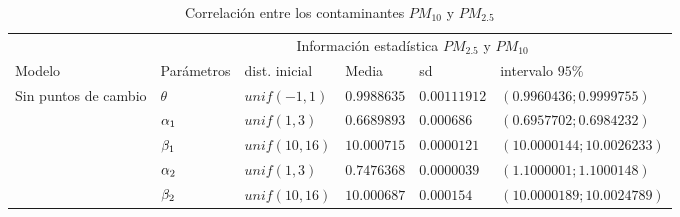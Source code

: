 \begin{table}[!h]
\centering
\begin{tabular}{|l|l|l|l|l|l|}
\hline
& \multicolumn{5}{c|}{Información estadística $PM_{2.5}$ y $PM_{10}$ } \\
\cline{2-6}
Modelo & Parámetros & dist. inicial  & Media & sd  &   intervalo $95 \%$\\
\hline \hline
\multirow{5}{1.5cm}{Sin puntos de cambio }
 & $\theta$ & $unif(-1,1)$ & $0.9988635$ & $0.00111912$ & $(0.9960436;0.9999755)$ \\ \cline{2-6}
& $\alpha_1$& $unif(1,3)$ & $0.6689893$ & $0.000686$ & $(0.6957702; 0.6984232)$\\  \cline{2-6}
& $\beta_1$& $unif(10,16)$ & $10.000715$ & $0.0000121$ & $(10.0000144;10.0026233 )$\\  \cline{2-6}
& $\alpha_2$& $unif(1,3)$ & $0.7476368 $ & $0.0000039$ & $(1.1000001; 1.1000148)$\\  \cline{2-6}
& $\beta_2$& $unif(10,16)$ & $10.000687$ & $0.000154$ & $(10.0000189;10.0024789)$\\  \cline{1-6}

\end{tabular}
\caption{Correlación entre los contaminantes $PM_{10}$ y $PM_{2.5}$  }
\label{infoestad_PM10_PM2.5}
\end{table}

